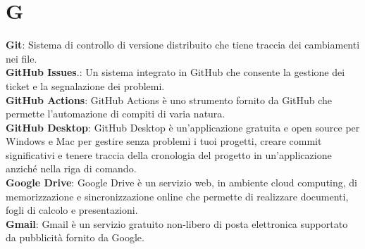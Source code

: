 \section{G}
\textbf{Git}: Sistema di controllo di versione distribuito che tiene traccia dei cambiamenti nei file.\\
\textbf{GitHub Issues}.: Un sistema integrato in GitHub che consente la gestione dei ticket e la segnalazione
dei problemi.\\
\textbf{GitHub Actions}: GitHub Actions è uno strumento fornito da GitHub che permette l’automazione di
compiti di varia natura.\\
\textbf{GitHub Desktop}: GitHub Desktop è un'applicazione gratuita e open source per Windows e Mac per gestire senza problemi i tuoi progetti, creare commit significativi e tenere traccia della cronologia del progetto in un'applicazione anziché nella riga di comando.\\
\textbf{Google Drive}: Google Drive è un servizio web, in ambiente cloud computing, di memorizzazione e
sincronizzazione online che permette di realizzare documenti, fogli di calcolo e presentazioni.\\
\textbf{Gmail}: Gmail è un servizio gratuito non-libero di posta elettronica supportato da pubblicità fornito da Google.\\
